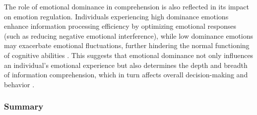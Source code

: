 The role of emotional dominance in comprehension is also reflected in its impact on emotion regulation. Individuals experiencing high dominance emotions enhance information processing efficiency by optimizing emotional responses (such as reducing negative emotional interference), while low dominance emotions may exacerbate emotional fluctuations, further hindering the normal functioning of cognitive abilities \cite{gross1998emerging, kurth2010link}. This suggests that emotional dominance not only influences an individual’s emotional experience but also determines the depth and breadth of information comprehension, which in turn affects overall decision-making and behavior \cite{mehrabian1996pleasure, johnson2012dominance}.

\subsubsection{Summary}

